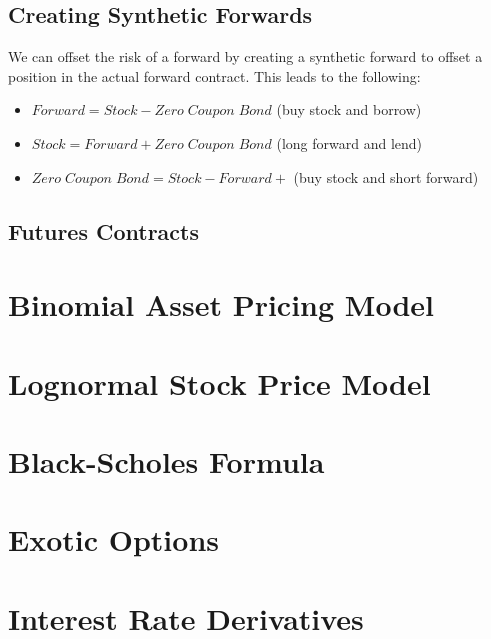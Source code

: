 \documentclass[11pt]{article}
\begin{document}
\subsection{Creating Synthetic Forwards}
We can offset the risk of a forward by creating a synthetic forward to offset a position in the actual forward contract. This leads to the following:
\begin{itemize}
\item $Forward = Stock - Zero \; Coupon \; Bond$ (buy stock and borrow)
\item $Stock = Forward + Zero \; Coupon \; Bond$ (long forward and lend)
\item $Zero \; Coupon \; Bond = Stock - Forward + $ (buy stock and short forward)
\end{itemize}
\subsection{Futures Contracts}


\pagebreak
\section{Binomial Asset Pricing Model}
\section{Lognormal Stock Price Model}
\section{Black-Scholes Formula}
\section{Exotic Options}
\section{Interest Rate Derivatives}
\end{document}

